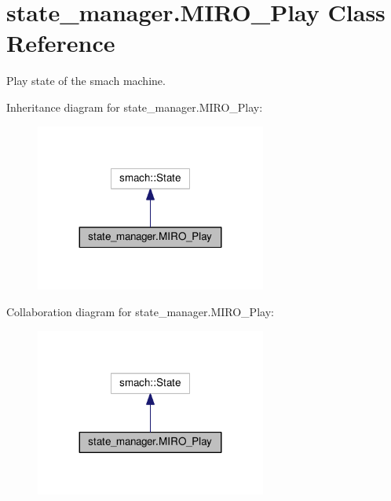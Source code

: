 \hypertarget{classstate__manager_1_1MIRO__Play}{}\section{state\+\_\+manager.\+M\+I\+R\+O\+\_\+\+Play Class Reference}
\label{classstate__manager_1_1MIRO__Play}


Play state of the smach machine.  




Inheritance diagram for state\+\_\+manager.\+M\+I\+R\+O\+\_\+\+Play\+:
\nopagebreak
\begin{figure}[H]
\begin{center}
\leavevmode
\includegraphics[width=215pt]{classstate__manager_1_1MIRO__Play__inherit__graph}
\end{center}
\end{figure}


Collaboration diagram for state\+\_\+manager.\+M\+I\+R\+O\+\_\+\+Play\+:
\nopagebreak
\begin{figure}[H]
\begin{center}
\leavevmode
\includegraphics[width=215pt]{classstate__manager_1_1MIRO__Play__coll__graph}
\end{center}
\end{figure}
